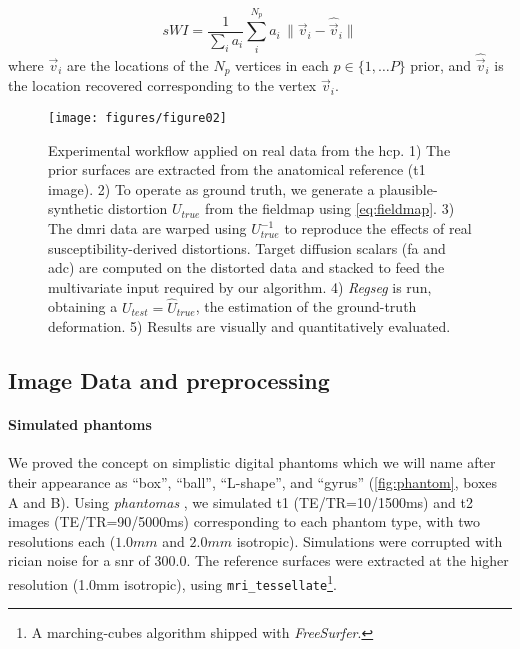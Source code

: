   \begin{equation}
  sWI = \frac{1}{\sum_i a_i} \sum\limits_i^{N_p} a_i\,\|
  \vec{v}_i - \hat{\vec{v}}_i \|
  \label{eq:swindex}
  \end{equation}
%
  where $\vec{v}_i$ are the locations of the $N_p$ vertices in each $p \in \{1, \dots P\}$
  prior, and $\hat{\vec{v}}_i$ is the location
  recovered corresponding to the vertex $\vec{v}_i$.


\begin{figure*}
\texttt{[image: figures/figure02]}
\caption{Experimental workflow applied on real data from the \acrfull*{hcp}.
  1) The prior surfaces are extracted from the anatomical reference (\gls*{t1} image).
	2) To operate as ground truth, we generate a plausible-synthetic distortion $U_{true}$
	  from the fieldmap using \eqref{eq:fieldmap}.
	3) The \gls*{dmri} data are warped using $U^{-1}_{true}$ to reproduce the effects of real
	  susceptibility-derived distortions.
	Target diffusion scalars (\gls*{fa} and \gls*{adc}) are computed on the distorted data and
		stacked to feed the multivariate input required by our algorithm.
	4) \emph{Regseg} is run, obtaining a $U_{test} = \hat{U}_{true}$, the estimation of
	  the ground-truth deformation.
	5) Results are visually and quantitatively evaluated.}\label{fig:evworkflows}
\end{figure*}


\subsection{Image Data and preprocessing}
\label{sec:datasets}

\paragraph*{Simulated phantoms}%
\label{sec:digital_phantoms}
We proved the concept on simplistic digital phantoms which we will name after their
  appearance as ``box'', ``ball'', ``L-shape'', and ``gyrus'' (\autoref{fig:phantom},
  boxes A and B).
Using \emph{phantomas} \citep{caruyer_phantomas_2014}, we simulated
  \gls*{t1} (TE/TR=10/1500ms) and \gls*{t2} images (TE/TR=90/5000ms)
  corresponding to each phantom type, with two resolutions each
  ($1.0mm$ and $2.0mm$ isotropic).
Simulations were corrupted with rician noise for a \gls*{snr} of 300.0.
The reference surfaces were extracted at the higher resolution (1.0mm isotropic),
  using \texttt{mri\_tessellate}\footnote{A marching-cubes algorithm shipped with 
  \emph{FreeSurfer}.}.

